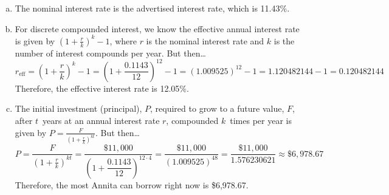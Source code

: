 \documentclass[11pt,letterpaper]{article}
\begin{document}
\sol 
\begin{enumerate}[(a)]
\item The nominal interest rate is the advertised interest rate, which is 11.43\%. \pspace

\item For discrete compounded interest, we know the effective annual interest rate is given by $(1 + \frac{r}{k})^k - 1$, where $r$ is the nominal interest rate and $k$ is the number of interest compounds per year. But then\dots
	\[
	r_{\text{eff}}= \left(1 + \dfrac{r}{k} \right)^k - 1= \left(1 + \dfrac{0.1143}{12} \right)^{12} - 1= (1.009525)^{12} - 1= 1.120482144 - 1= 0.120482144
	\]
Therefore, the effective interest rate is 12.05\%. \pspace

\item The initial investment (principal), $P$, required to grow to a future value, $F$, after $t$~years at an annual interest rate $r$, compounded $k$~times per year is given by $P= \frac{F}{\left(1 + \frac{r}{k} \right)^{kt}}$. But then\dots
	\[
	P= \dfrac{F}{\left(1 + \frac{r}{k} \right)^{kt}}= \dfrac{\$11,\!000}{\left(1 + \dfrac{0.1143}{12} \right)^{12 \cdot 4}}= \dfrac{\$11,\!000}{(1.009525)^{48}}= \dfrac{\$11,\!000}{1.576230621} \approx \$6,\!978.67
	\]
Therefore, the most Annita can borrow right now is \$6,978.67. 
\end{enumerate}
\end{document}
